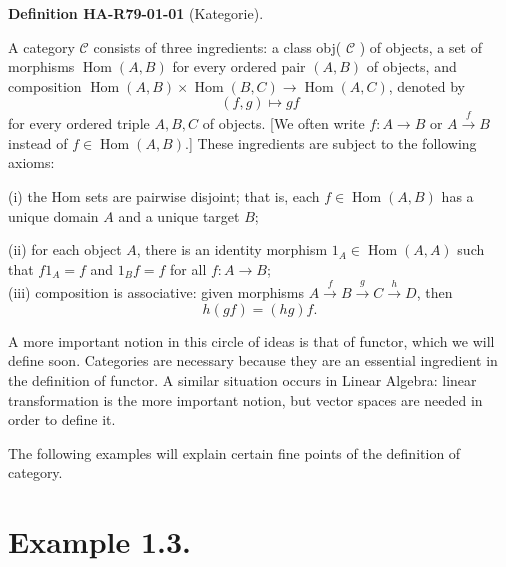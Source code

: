 \documentclass[10pt, letterpaper]{article}
\newcommand{\CustomHeading}[3]{%
  \par\medskip\noindent%
  \textbf{#1 #2} \textnormal{(#3)}.\enskip%
}
\newenvironment{DEF}[2]{\begin{unitbox}\CustomHeading{Definition}{#1}{#2}}{\end{unitbox}}
\begin{document}
\begin{DEF}{HA-R79-01-01}{Kategorie}
A category $\mathcal{C}$ consists of three ingredients: a class obj( $\mathcal{C}$ ) of objects, a set of morphisms $\operatorname{Hom}(A, B)$ for every ordered pair $(A, B)$ of objects, and composition $\operatorname{Hom}(A, B) \times \operatorname{Hom}(B, C) \rightarrow \operatorname{Hom}(A, C)$, denoted by
$$
(f, g) \mapsto g f
$$
for every ordered triple $A, B, C$ of objects. [We often write $f: A \rightarrow B$ or $A \xrightarrow{f} B$ instead of $f \in \operatorname{Hom}(A, B)$.] These ingredients are subject to the following axioms:

(i) the Hom sets are pairwise disjoint; that is, each $f \in \operatorname{Hom}(A, B)$ has a unique domain $A$ and a unique target $B$;



(ii) for each object $A$, there is an identity morphism $1_{A} \in \operatorname{Hom}(A, A)$ such that $f 1_{A}=f$ and $1_{B} f=f$ for all $f: A \rightarrow B$;\\

(iii) composition is associative: given morphisms $A \xrightarrow{f} B \xrightarrow{g} C \xrightarrow{h} D$, then
$$
h(g f)=(h g) f .
$$
\end{DEF}




A more important notion in this circle of ideas is that of functor, which we will define soon. Categories are necessary because they are an essential ingredient in the definition of functor. A similar situation occurs in Linear Algebra: linear transformation is the more important notion, but vector spaces are needed in order to define it.

The following examples will explain certain fine points of the definition of category.

\section*{Example 1.3.}
\end{document}
